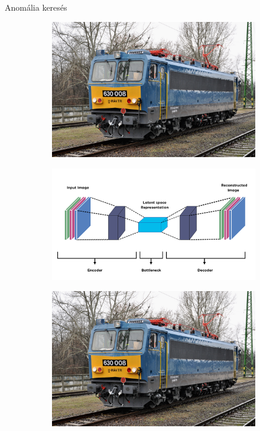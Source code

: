 \documentclass[aspectratio=169]{beamer}
\begin{document}
\begin{frame}{Anomália keresés}
    \begin{figure}
        \centering
        \begin{subfigure}{0.2\textwidth}
            \centering
            \includegraphics[width=\textwidth]{./tex_images/gigant_2.jpg}
        \end{subfigure}
        \begin{subfigure}{0.4\textwidth}
            \centering
            \includegraphics[width=\textwidth]{./tex_images/autoencoder.png}
        \end{subfigure}
        \begin{subfigure}{0.2\textwidth}
            \centering
            \includegraphics[width=\textwidth]{./tex_images/gigant_2.jpg}

\end{subfigure}
\end{figure}
\end{frame}
\end{document}
